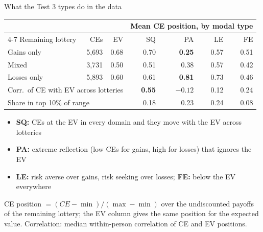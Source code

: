 \documentclass[aspectratio=169,11pt]{beamer}
\newcommand{\tabnote}[1]{\par\vfill{\scriptsize\color{muted}#1\par}}
\newcommand{\tight}{\setlength{\itemsep}{3pt}}
\begin{document}
\begin{frame}{What the Test 3 types do in the data}
{\centering\footnotesize
\begin{tabular}{l r r rrrr}
\toprule
& & & \multicolumn{4}{c}{Mean CE position, by modal type}\\
\cmidrule(lr){4-7}
Remaining lottery & CEs & EV & SQ & PA & LE & FE\\
\midrule
Gains only & 5{,}693 & 0.68 & 0.70 & \textbf{0.25} & 0.57 & 0.51\\
Mixed & 3{,}731 & 0.50 & 0.51 & 0.38 & 0.57 & 0.42\\
Losses only & 5{,}893 & 0.60 & 0.61 & \textbf{0.81} & 0.73 & 0.46\\
\midrule
\multicolumn{3}{l}{Corr.\ of CE with EV across lotteries} & \textbf{0.55} & $-0.12$ & 0.12 & 0.24\\
\multicolumn{3}{l}{Share in top 10\% of range} & 0.18 & 0.23 & 0.24 & 0.08\\
\bottomrule
\end{tabular}\par}
\begin{itemize}\small\tight
  \item \textbf{SQ:} CEs at the EV in every domain and they move with the EV across lotteries
  \item \textbf{PA:} extreme reflection (low CEs for gains, high for losses) that ignores the EV
  \item \textbf{LE:} risk averse over gains, risk seeking over losses; \textbf{FE:} below the EV everywhere
\end{itemize}
\tabnote{CE position $=(CE-\min)/(\max-\min)$ over the undiscounted payoffs of the remaining lottery; the EV column gives the same position for the expected value. Correlation: median within-person correlation of CE and EV positions.}
\end{frame}
\end{document}
